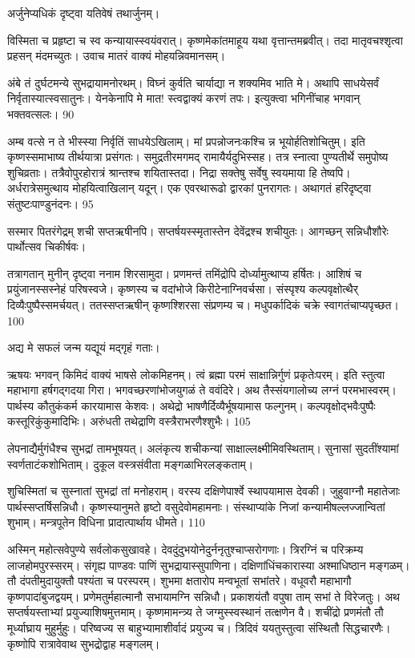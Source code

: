 अर्जुनेप्यधिकं दृष्ट्वा यतिवेषं तथार्जुनम्।

विस्मिता च प्रहृष्टा च स्व कन्यायास्स्वयंवरात्।
कृष्णमेकांतमाहूय यथा वृत्तान्तमब्रवीत्।
तदा मातृवचश्शृत्वा प्रहसन् मंदमच्युतः।
उवाच मातरं वाक्यं मोहयन्निवमानसम्।

अंबे तं दुर्घटमन्ये सुभद्रायामनोरथम्।
विघ्नं कुर्वति चार्याद्या न शक्यमिव भाति मे।
अथापि साधयेसर्वं निर्वृतास्यात्स्वसातुनः।
येनकेनापि मे मात! स्त्वद्वाक्यं करणं तपः।
इत्युक्त्वा भगिनींचाह भगवान् भक्तवत्सलः।
90

अम्ब वत्से न ते भीस्स्या निर्वृतिं साधयेऽखिलाम्।
मां प्रपन्नोजनःकश्चि न्न भूयोर्हतिशोचितुम्।
इति कृष्णस्समाभाष्य तीर्थयात्रा प्रसंगतः।
समुद्रतीरमगमद् रामायैर्यदुभिस्सह।
तत्र स्नात्वा पुण्यतीर्थे समुपोष्य शुचिव्रताः।
तत्रैवोपुरहोरात्रं श्रान्तश्च शयितास्तदा।
निद्रा सक्तेषु सर्वेषु स्वयमाया हि तेष्वपि।
अर्धरात्रेसमुत्थाय मोहयित्वाखिलान् यदून्।
एक एवरथारूढो द्वारकां पुनरागतः।
अथागतं हरिदृष्ट्वा संतुष्टःपाण्डुनंदनः।
95

सस्मार पितरंगेद्रम् शची सप्तऋषीनपि।
सप्तर्षयस्स्मृतास्तेन देवेंद्रश्च शचीयुतः।
आगच्छन् सन्निधौशौरेः पार्थोत्सव चिकीर्षवः।

तत्रागतान् मुनीन् दृष्ट्वा ननाम शिरसामुदा।
प्रणमन्तं तमिंद्रोपि दोर्ध्यामुत्थाप्य हर्षितः।
आशिषं च प्रयुंजानस्सस्नेहं परिषस्वजे।
कृष्णस्य च वदांभोजे किरीटेनाग्निवर्चसा।
संस्पृश्य कल्पवृक्षोत्थैर् दिव्यैःपुष्पैस्समर्चयत्।
ततस्सप्तऋषीन् कृष्णश्शिरसा संप्रणम्य च।
मधुपर्कादिकं चक्रे स्वागतंचाप्यपृच्छत।
100

अद्य मे सफलं जन्म यद्यूयं मद्गृहं गताः।

ऋषयः
भगवन् किमिदं वाक्यं भाषसे लोकमिहनम्।
त्वं ब्रह्मा परमं साक्षान्निर्गुणं प्रकृतेःपरम्।
इति स्तुत्वा महाभागा हर्षगद्गदया गिरा।
भगवच्छरणांभोजयुगळं ते ववंदिरे।
अथ तैस्संयगालोच्य लग्नं परमभास्वरम्।
पार्थस्य कौतुकंकर्म कारयामास केशवः।
अथेद्रो भाषणैर्दिव्यैर्भूषयामास फल्गुनम्।
कल्पवृक्षोद्भवैःपुष्पैः कस्तूरिकुंकुमादिभिः।
अरुंधती तथेद्राणि वस्त्रैराभरणैश्शुभैः।
105

लेपनाद्यैर्मुगंधैश्च सुभद्रां तामभूषयत्।
अलंकृत्य शचीकन्यां साक्षाल्लक्ष्मीमिवस्थिताम्।
सुनासां सुदतींश्यामां स्वर्णताटंकशोभिताम्।
दुकूल वस्त्रसंवीता मङ्गळाभिरलङ्कताम्।

शुचिस्मितां च सुस्नातां सुभद्रां तां मनोहराम्।
वरस्य दक्षिणेपार्श्वे स्थापयामास देवकी।
जुहुवाग्नौ महातेजाः पार्थस्सप्तर्षिसन्निधौ।
कृष्णस्यानुमते हृष्टो वसुदेवोमहामनाः।
संस्थाप्यांके निजां कन्यामीषल्लज्जान्वितां शुभाम्।
मन्त्रपूतेन विधिना प्रादात्पार्थाय धीमते।
110

अस्मिन् महोत्सवेपुण्ये सर्वलोकसुखावहे।
देवदुंदुभयोनेदुर्ननृतुश्चाप्सरोगणाः।
त्रिरग्निं च परिक्रम्य लाजहोमपुरस्सरम्।
संगृह्य पाण्डवः पाणिं सुभद्रायास्सुपाणिना।
दक्षिणांधिंचकारास्या अश्माधिष्ठान मङ्गळम्।
तौ दंपतीमुदायुक्तौ पश्यंता च परस्परम्।
शुभमा क्षतारोप मन्वभूतां सभांतरे।
वधूवरौ महाभागौ कृष्णपादांबुजद्वयम्।
प्रणेमतुर्महात्मानौ सभायामग्नि सन्निधौ।
प्रकाशयंतौ वपुषा ताम् सभां ते विरेजतुः।
अथ सप्तर्षयस्ताभ्यां प्रयुज्याशिषमुत्तमाम्।
कृष्णमामन्त्र्य ते जग्मुस्स्वस्थानं तत्क्षणेन वै।
शचींद्रो प्रणमंतौ तौ मूर्ध्याघ्राय मुहुर्मुहुः।
परिष्वज्य स बाहुभ्यामाशीर्वादं प्रयुज्य च।
त्रिदिवं ययतुस्तुत्वा संस्थितौ सिद्धचारणैः।
कृष्णोपि रात्रावेवाथ सुभद्रोद्वाह मङ्गलम्।

